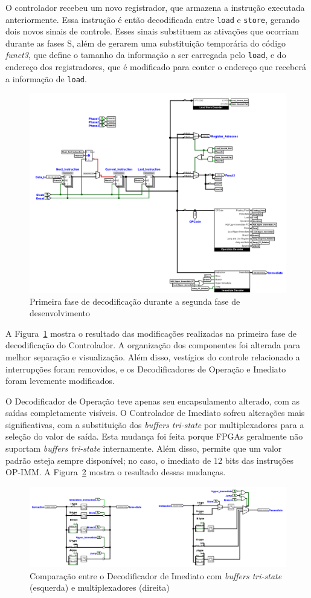\documentclass[
	12pt,				%
	openright,			%
	oneside,			%
	a4paper,			%
	english,			%
	french,				%
	spanish,			%
	brazil,				%
	]{abntex2}
\begin{document}
O controlador recebeu um novo registrador, que armazena a instrução executada anteriormente. Essa instrução é então decodificada entre \texttt{load} e \texttt{store}, gerando dois novos sinais de controle. Esses sinais substituem as ativações que ocorriam durante as fases S, além de gerarem uma substituição temporária do código \textit{funct3}, que define o tamanho da informação a ser carregada pelo \texttt{load}, e do endereço dos registradores, que é modificado para conter o endereço que receberá a informação de \texttt{load}.

\begin{figure}[h]
    \centering
    \includegraphics[width=0.5\linewidth]{ProcessoDesenvolvimento/Arquitetura/controlador_2_1.png}
    \caption{Primeira fase de decodificação durante a segunda fase de desenvolvimento}
    \label{fig:controlador_2_1}
\end{figure}

A Figura~\ref{fig:controlador_2_1} mostra o resultado das modificações realizadas na primeira fase de decodificação do Controlador. A organização dos componentes foi alterada para melhor separação e visualização. Além disso, vestígios do controle relacionado a interrupções foram removidos, e os Decodificadores de Operação e Imediato foram levemente modificados.

O Decodificador de Operação teve apenas seu encapsulamento alterado, com as saídas completamente visíveis. O Controlador de Imediato sofreu alterações mais significativas, com a substituição dos \textit{buffers tri-state} por multiplexadores para a seleção do valor de saída. Esta mudança foi feita porque FPGAs geralmente não suportam \textit{buffers tri-state} internamente. Além disso, permite que um valor padrão esteja sempre disponível; no caso, o imediato de 12 bits das instruções OP-IMM. A Figura~\ref{fig:Immediates2} mostra o resultado dessas mudanças.

\begin{figure}
    \centering
    \includegraphics[width=1\linewidth]{ProcessoDesenvolvimento/Arquitetura/Immediates2.png}
    \caption{Comparação entre o Decodificador de Imediato com \textit{buffers tri-state} (esquerda) e multiplexadores (direita)}
    \label{fig:Immediates2}
\end{figure}
\end{document}

